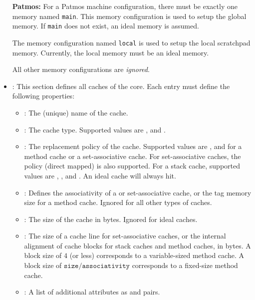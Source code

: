 \begin{itemize}
  \begin{framed}
  \textbf{Patmos:} For a Patmos machine configuration, there must be exactly one memory named \texttt{main}. This memory configuration is used to setup
    the global memory. If \texttt{main} does not exist, an ideal memory is assumed.

    The memory configuration named \texttt{local} is used to setup the local scratchpad memory. Currently, the local memory must be
    an ideal memory.

    All other memory configurations are \emph{ignored}.
  \end{framed}

\item {}: This section defines all caches of the core. Each entry must define the following properties:
  
  \begin{itemize}
  \item {}: The (unique) name of the cache.
  \item {}: The cache type. Supported values are ,  and .
  \item {}: The replacement policy of the cache. Supported values are ,  and
     for a method cache or a set-associative cache. For set-associative caches, the policy  (direct
    mapped) is also supported. For a stack cache, supported values are , ,  and
    .
    An ideal cache will always hit.
  \item {}: Defines the associativity of a  or  set-associative cache, or the 
    tag memory size for a method cache. Ignored for all other types of caches.
  \item {}: The size of the cache in bytes. Ignored for ideal caches.
  \item {}: The size of a cache line for set-associative caches, or the internal alignment of cache
    blocks for stack caches and method caches, in bytes. A block size of $4$ (or less) corresponds to a
    variable-sized method cache. A block size of $\texttt{size}/\texttt{associativity}$ corresponds to a fixed-size
    method cache.
  \item {}: A list of additional attributes as  and  pairs.
  \end{itemize}


\end{itemize}
